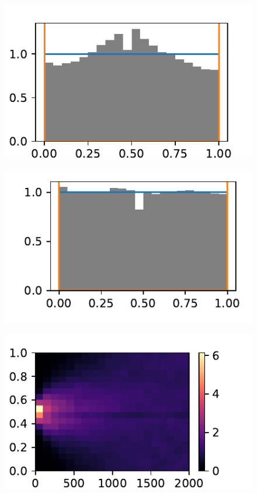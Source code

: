 \documentclass[
    parskip=half, 
    twoside=false,
    twocolumn=true,
    fontsize=11pt,
]{scrarticle}
\begin{document}
\begin{figure}
 \label{fig:pt2_histogram}
\includegraphics{figures/02 histogram.pdf}
\end{figure}
\begin{figure}
 \label{fig:pt2_histogram_random}
\includegraphics{figures/02 histogram random start.pdf}
\end{figure}
\begin{figure}
 \label{fig:pt2_histogram_time}
\includegraphics{figures/02 histogram evolution.pdf}
\end{figure}
\end{document}
